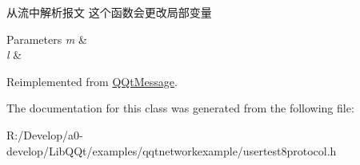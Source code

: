 从流中解析报文 这个函数会更改局部变量 


\begin{DoxyParams}{Parameters}
{\em m} & \\
\hline
{\em l} & \\
\hline
\end{DoxyParams}


Reimplemented from \mbox{\hyperlink{class_q_qt_message_a0bc25669bdd61490b1d8df6d77565f31}{Q\+Qt\+Message}}.



The documentation for this class was generated from the following file\+:\begin{DoxyCompactItemize}
\item 
R\+:/\+Develop/a0-\/develop/\+Lib\+Q\+Qt/examples/qqtnetworkexample/usertest8protocol.\+h\end{DoxyCompactItemize}
